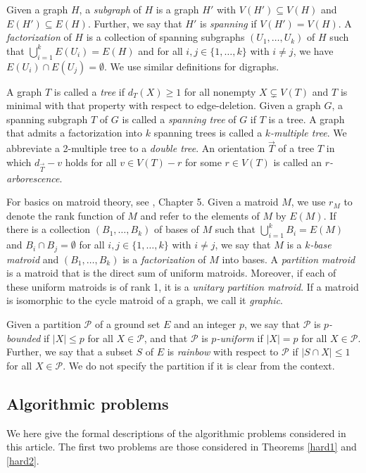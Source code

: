 \documentclass{article}
\begin{document}
Given a graph $H$, a {\it subgraph} of $H$ is a graph $H'$ with $V(H')\subseteq V(H)$ and $E(H')\subseteq E(H)$. Further, we say that $H'$ is {\it spanning} if $V(H')=V(H)$. A {\it factorization} of $H$ is a collection of spanning  subgraphs $(U_1,\ldots,U_k)$ of $H$ such that $\bigcup_{i=1}^kE(U_i)=E(H)$ and for all $i,j \in \{1,\ldots,k\}$ with $i \neq j$, we have $E(U_i)\cap E(U_j)= \emptyset$. We use similar definitions for digraphs.

A graph $T$ is called a {\it tree} if $d_T(X)\geq 1$ for all nonempty $X\subsetneq V(T)$ and $T$ is minimal with that property with respect to edge-deletion. Given a graph $G$, a spanning subgraph $T$ of $G$ is called a {\it spanning tree} of $G$ if $T$ is a tree. A graph that admits a factorization into $k$ spanning trees is called a {\it $k$-multiple tree}. We abbreviate a 2-multiple tree to a {\it double tree}. An orientation $\vec{T}$ of a tree $T$ in which $d_{\vec{T}}-v$ holds for all $v \in V(T)-r$ for some $r \in V(T)$ is called an {\it $r$-arborescence}.

For basics on matroid theory, see \cite{book}, Chapter 5. Given a matroid $M$, we use $r_M$ to denote the rank function of $M$ and refer to the elements of $M$ by $E(M)$. If there is a collection $(B_1,\ldots,B_k)$ of bases of $M$ such that $\bigcup_{i=1}^k B_i=E(M)$ and $B_i\cap B_j= \emptyset$ for all $i,j \in\{1,\ldots,k\}$ with $i \neq j$, we say that $M$ is a {\it $k$-base matroid} and $(B_1,\ldots,B_k)$ is a {\it factorization} of $M$ into bases. A {\it partition matroid} is a matroid that is the direct sum of uniform matroids. Moreover, if each of these uniform matroids is of rank 1, it is a {\it unitary partition matroid}. If a matroid is isomorphic to the cycle matroid of a graph, we call it {\it graphic}.

Given a partition $\mathcal{P}$ of a ground set $E$ and an integer $p$, we say that $\mathcal{P}$ is {\it $p$-bounded} if $|X|\leq p$ for all $X \in \mathcal{P}$, and that $\mathcal{P}$ is {\it $p$-uniform} if $|X|= p$ for all $X \in \mathcal{P}$. Further, we say that a subset $S$ of $E$ is {\it rainbow} with respect to $\mathcal{P}$ if $|S \cap X|\leq 1$ for all $X \in \mathcal{P}$. We do not specify the partition if it is clear from the context.

\subsection{Algorithmic problems}\label{algo}
We here give the formal descriptions of the algorithmic problems considered in this article. The first two problems are those considered in Theorems \ref{hard1} and \ref{hard2}.
\end{document}

